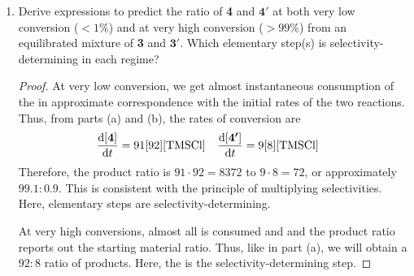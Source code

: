 \documentclass[../psets.tex]{subfiles}
\begin{document}
\begin{enumerate}
\begin{enumerate}
\begin{proof}
        \end{proof}
        \pagebreak
        \item Derive expressions to predict the ratio of \textbf{4} and $\bm{4'}$ at both very low conversion ($<1\%$) and at very high conversion ($>99\%$) from an equilibrated mixture of \textbf{3} and $\bm{3'}$. Which elementary step(s) is selectivity-determining in each regime?
        \begin{proof}

            At very low conversion, we get almost instantaneous consumption of the  in approximate correspondence with the initial rates of the two reactions. Thus, from parts (a) and (b), the rates of conversion are
            \begin{align*}
                \dv{[\bm{4}]}{t}  &= 91[92]\cnc{TMSCl}&
                \dv{[\bm{4'}]}{t} &= 9[8]\cnc{TMSCl}
            \end{align*}
            Therefore, the product ratio is $91\cdot 92=8372$ to $9\cdot 8=72$, or approximately $\boxed{99.1:0.9}$. This is consistent with the principle of multiplying selectivities. Here,  elementary steps are selectivity-determining.\par
            At very high conversions, almost all  is consumed and and the product ratio reports out the starting material ratio. Thus, like in part (a), we will obtain a $\boxed{92:8}$ ratio of products. Here, the  is the selectivity-determining step.
        \end{proof}
    \end{enumerate}
\end{enumerate}
\end{document}
